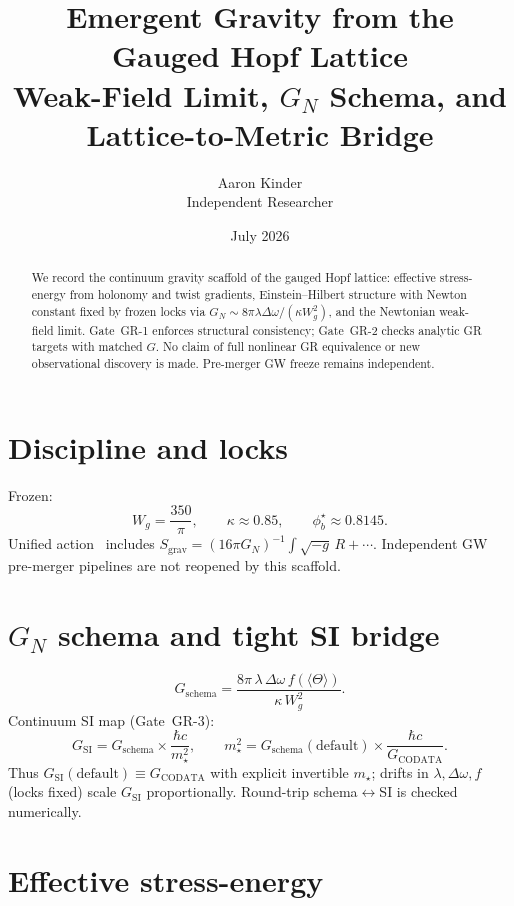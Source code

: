 \documentclass[11pt]{article}
\title{Emergent Gravity from the Gauged Hopf Lattice\\
\large Weak-Field Limit, $G_N$ Schema, and Lattice-to-Metric Bridge}
\author{Aaron Kinder \\ Independent Researcher}
\date{July 2026}
\begin{document}
\maketitle

\begin{abstract}
We record the continuum gravity scaffold of the gauged Hopf lattice: effective
stress-energy from holonomy and twist gradients, Einstein--Hilbert structure with
Newton constant fixed by frozen locks via
$G_N\sim 8\pi\lambda\Delta\omega/(\kappa W_g^2)$, and the Newtonian weak-field limit.
Gate~GR-1 enforces structural consistency; Gate~GR-2 checks analytic GR targets
with matched $G$. No claim of full nonlinear GR equivalence or new observational
discovery is made. Pre-merger GW freeze remains independent.
\end{abstract}

\section{Discipline and locks}

Frozen:
\[
W_g=\frac{350}{\pi},\qquad \kappa\approx 0.85,\qquad \phi_b^\star\approx 0.8145.
\]
Unified action~\cite{lag,rel} includes
$S_{\mathrm{grav}}= (16\pi G_N)^{-1}\int\sqrt{-g}\,R+\cdots$.
Independent GW pre-merger pipelines are not reopened by this scaffold.

\section{$G_N$ schema and tight SI bridge}

\begin{equation}
G_{\mathrm{schema}}
=\frac{8\pi\,\lambda\,\Delta\omega\,f(\langle\Theta\rangle)}{\kappa\,W_g^{2}}.
\label{eq:GN-schema}
\end{equation}
Continuum SI map (Gate~GR-3):
\begin{equation}
G_{\mathrm{SI}}
= G_{\mathrm{schema}}\times\frac{\hbar c}{m_\star^{2}},
\qquad
m_\star^{2}
= G_{\mathrm{schema}}(\mathrm{default})\times\frac{\hbar c}{G_{\mathrm{CODATA}}}.
\label{eq:SI-bridge}
\end{equation}
Thus $G_{\mathrm{SI}}(\mathrm{default})\equiv G_{\mathrm{CODATA}}$ with explicit invertible
$m_\star$; drifts in $\lambda,\Delta\omega,f$ (locks fixed) scale $G_{\mathrm{SI}}$
proportionally. Round-trip schema$\leftrightarrow$SI is checked numerically.

\section{Effective stress-energy}
\end{document}
